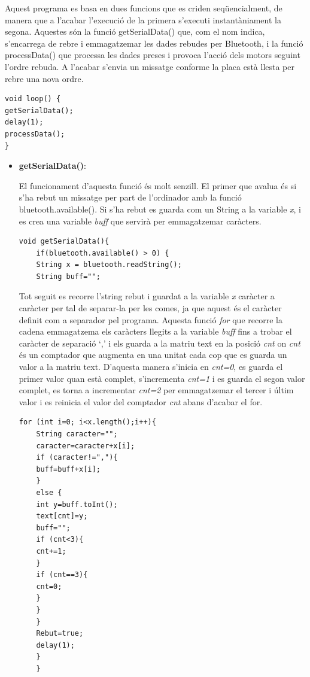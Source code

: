 Aquest programa es basa en dues funcions que es criden seqüencialment, de manera que a l'acabar l’execució de la primera s’executi instantàniament la segona. Aquestes són la funció getSerialData() que, com el nom indica, s’encarrega de rebre i emmagatzemar les dades rebudes per Bluetooth, i la funció processData() que processa les dades preses i provoca l’acció dels motors seguint l’ordre rebuda. A l'acabar s’envia un missatge conforme la placa està llesta per rebre una nova ordre. 
\begin{lstlisting}[style=Arduino]
void loop() {
getSerialData();
delay(1);
processData();
}
\end{lstlisting}
\begin{itemize}
	\item \textbf{getSerialData()}:
	
	El funcionament d’aquesta funció és molt senzill. El primer que avalua és si s’ha rebut un missatge per part de l’ordinador amb la funció bluetooth.available(). Si s’ha rebut es guarda com un String a la variable \emph{x}, i es crea una variable \emph{buff} que servirà per emmagatzemar caràcters. 
	
	\begin{lstlisting}[style=Arduino]
	void getSerialData(){
	if(bluetooth.available() > 0) {
	String x = bluetooth.readString();
	String buff="";
	\end{lstlisting}
	
	Tot seguit es recorre l’string rebut i guardat a la variable \emph{x} caràcter a caràcter per tal de separar-la per les comes, ja que aquest és el caràcter definit com a separador pel programa. Aquesta funció \emph{for} que recorre la cadena emmagatzema els caràcters llegits a la variable \emph{buff} fins a trobar el caràcter de separació ‘,’ i els guarda a la matriu text en la posició \emph{cnt} on \emph{cnt} és un comptador que augmenta en una unitat cada cop que es guarda un valor a la matriu text. D’aquesta manera s’inicia en \emph{cnt=0}, es guarda el primer valor quan està complet, s’incrementa \emph{cnt=1} i es guarda el segon valor complet, es torna a incrementar \emph{cnt=2} per emmagatzemar el tercer i últim valor i es reinicia el valor del comptador \emph{cnt} abans d’acabar el for. 
	
	\begin{lstlisting}[style=Arduino]
	for (int i=0; i<x.length();i++){
	String caracter="";
	caracter=caracter+x[i];
	if (caracter!=","){
	buff=buff+x[i];
	}
	else {
	int y=buff.toInt();
	text[cnt]=y;
	buff="";
	if (cnt<3){
	cnt+=1;
	}
	if (cnt==3){
	cnt=0;
	}
	}
	}
	Rebut=true;
	delay(1);    
	}
	}
	\end{lstlisting}
	

\end{itemize}
